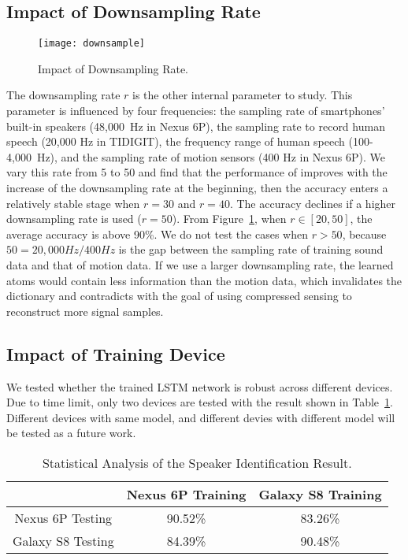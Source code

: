 \subsection{Impact of Downsampling Rate}\label{sec:impact:downrate}
\begin{figure}[h]
	\centering
	\texttt{[image: downsample]}
	\vspace{-.1in}
	\caption{Impact of Downsampling Rate.}
	\label{fig:downsampling}
	\vspace{-.1in}
\end{figure}

The downsampling rate $r$ is the other internal parameter to study. This parameter is influenced by four frequencies: the sampling rate of smartphones' built-in speakers (48,000~Hz in Nexus 6P), the sampling rate to record human speech (20,000 Hz in TIDIGIT), the frequency range of human speech (100-4,000~Hz), and the sampling rate of motion sensors (400 Hz in Nexus 6P). 
%
We vary this rate from 5 to 50 and find that the performance of {\systemName} improves with the increase of the downsampling rate at the beginning, then the accuracy enters a relatively stable stage when $r=30$ and $r=40$. The accuracy declines if a higher downsampling rate is used ($r=50$). From Figure~\ref{fig:downsampling}, when $r \in [20, 50]$, the average accuracy is above 90\%. 
%
We do not test the cases when $r > 50$, because $50 = 20,000 Hz / 400 Hz$ is the gap between the sampling rate of training sound data and that of motion data. If we use a larger downsampling rate, the learned atoms would contain less information than the motion data, which invalidates the dictionary and contradicts with the goal of using compressed sensing to reconstruct more signal samples. 




\subsection{Impact of Training Device}\label{sec:impact:device}
We tested whether the trained LSTM network is robust across different devices. Due to time limit, only two devices are tested with the result shown in Table~\ref{tab:device}. Different devices with same model, and different devies with different model will be tested as a future work.
\begin{table}[!h]
	\caption{Statistical Analysis of the Speaker Identification Result.}
	\label{tab:device}
	\centering	
	\centering
	\begin{tabular}{ccc}
		\toprule[0.5pt]
		& Nexus 6P Training& Galaxy S8 Training\\
		\midrule[0.5pt]
		Nexus 6P Testing & 90.52\% & 83.26\%\\
		Galaxy S8 Testing & 84.39\% & 90.48\% \\
		\bottomrule[0.5pt]
	\end{tabular}
\end{table}

